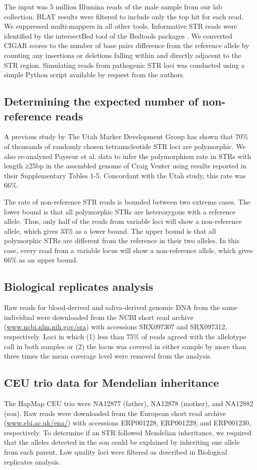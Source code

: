 {The input was 5 million Illumina reads of the male sample from our lab collection. BLAT results were filtered to include only the top hit for each read. We suppressed multi-mappers in all other tools. Informative STR reads were identified by the intersectBed tool of the Bedtools packages \cite{QuinlanHall2010}. We converted CIGAR scores to the number of base pairs difference from the reference allele by counting any insertions or deletions falling within and directly adjacent to the STR region. Simulating reads from pathogenic STR loci was conducted using a simple Python script available by request from the authors. 

\subsection{Determining the expected number of non-reference reads}

A previous study by The Utah Marker Development Group has shown that 70\% of thousands of randomly chosen tetranucleotide STR loci are polymorphic. We also re-analyzed Payseur et al. data to infer the polymorphism rate in STRs with length ≥25bp in the assembled genome of Craig Venter using results reported in their Supplementary Tables 1-5. Concordant with the Utah study, this rate was 66\%.

The rate of non-reference STR reads is bounded between two extreme cases. The lower bound is that all polymorphic STRs are heterozygous with a reference allele. Thus, only half of the reads from variable loci will show a non-reference allele, which gives 33\% as a lower bound. The upper bound is that all polymorphic STRs are different from the reference in their two alleles. In this case, every read from a variable locus will show a non-reference allele, which gives 66\% as an upper bound.  

\subsection{Biological replicates analysis}
Raw reads for blood-derived and saliva-derived genomic DNA from the same individual were downloaded from the NCBI short read archive (\url{www.ncbi.nlm.nih.gov/sra}) with accessions SRX097307 and SRX097312, respectively. Loci in which (1) less than 75\% of reads agreed with the allelotype call in both samples or (2) the locus was covered in either sample by more than three times the mean coverage level were removed from the analysis.

\subsection{CEU trio data for Mendelian inheritance}
The HapMap CEU trio were NA12877 (father), NA12878 (mother), and NA12882 (son). Raw reads were downloaded from the European short read archive (\url{www.ebi.ac.uk/ena/}) with accessions ERP001228, ERP001229, and ERP001230, respectively. To determine if an STR followed Mendelian inheritance, we required that the alleles detected in the son could be explained by inheriting one allele from each parent. Low quality loci were filtered as described in Biological replicates analysis.

}
